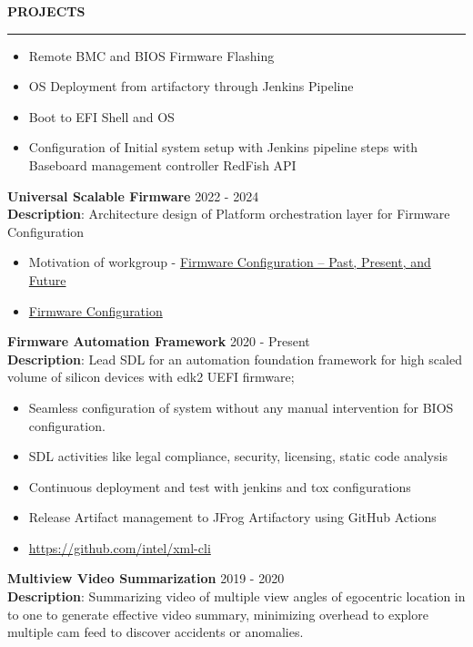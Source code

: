 \documentclass{resume} %
\renewenvironment{rSection}[1]{ %
  \sectionskip
  \textcolor{primaryColor}{\MakeUppercase{\bf #1}} %
  \sectionlineskip
  {\color{primaryColor}\hrule} %
  \begin{list}{}{ %
    \setlength{\leftmargin}{1.5em} %
  }
  \item[]
}{
  \end{list}
}
\begin{document}
\begin{rSection}{Projects}
\begin{itemize}
    \item Remote BMC and BIOS Firmware Flashing
    \item OS Deployment from artifactory through Jenkins Pipeline
    \item Boot to EFI Shell and OS
    \item Configuration of Initial system setup with Jenkins pipeline steps with Baseboard management controller RedFish API
\end{itemize}

{\textbf{\textcolor{accentColor}{Universal Scalable Firmware}}} \hfill {2022 - 2024} \\
\textbf{Description}: Architecture design of Platform orchestration layer for Firmware Configuration

\begin{itemize}
    \item Motivation of workgroup - \href{https://uefi.org/sites/default/files/resources/Firmware%20Configuration%20%E2%80%93%20Past%2C%20Present%2C%20and%20Future_Zimmer.pdf}{Firmware Configuration – Past, Present, and Future}
    \item \href{https://universalscalablefirmware.github.io/documentation/7_yaml_boot_configuration.html}{Firmware Configuration}
\end{itemize}

{\textbf{\textcolor{accentColor}{Firmware Automation Framework}}}  \hfill {2020 - Present} \\
\textbf{Description}: Lead SDL for an automation foundation framework for high scaled volume of silicon devices with edk2 UEFI firmware;

\begin{itemize}
    \item Seamless configuration of system without any manual intervention for BIOS configuration.
    \item SDL activities like legal compliance, security, licensing, static code analysis
    \item Continuous deployment and test with jenkins and tox configurations
    \item Release Artifact management to JFrog Artifactory using GitHub Actions
    \item \href{https://github.com/intel/xml-cli}{https://github.com/intel/xml-cli}
\end{itemize}

{\textbf{\textcolor{accentColor}{Multiview Video Summarization}}} \hfill {2019 - 2020}\\
\textbf{Description}: Summarizing video of multiple view angles of egocentric location in to one to generate effective video summary, minimizing overhead to explore multiple cam feed to discover accidents or anomalies.

\end{rSection}
\end{document}
